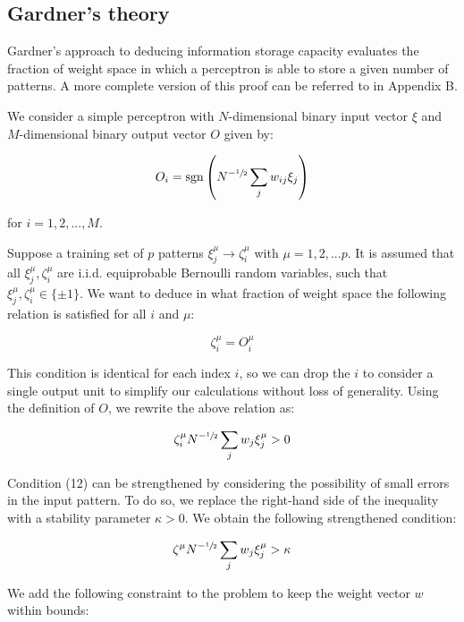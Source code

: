 \documentclass[a4paper, 11pt]{article}
\begin{document}
\subsection{Gardner's theory}

Gardner's approach to deducing information storage capacity evaluates the fraction of weight space in which a perceptron is able to store a given number of patterns. A more complete version of this proof can be referred to in Appendix B.

We consider a simple perceptron with $N$-dimensional binary input vector $\xi$ and $M$-dimensional binary output vector $O$ given by:

\begin{equation}
    O_i = \mathrm{sgn} \left( N^{-\sfrac{1}{2}} \sum_j w_{ij} \xi_j \right)
\end{equation}

\noindent for $i = 1, 2, ..., M$.

Suppose a training set of $p$ patterns $\xi_j^\mu \longrightarrow \zeta_i^\mu$ with $\mu = 1, 2, ... p$. It is assumed that all $\xi_j^\mu, \zeta_i^\mu$ are i.i.d. equiprobable Bernoulli random variables, such that $\xi_j^\mu, \zeta_i^\mu \in \{ \pm 1 \}$. We want to deduce in what fraction of weight space the following relation is satisfied for all $i$ and $\mu$:

\begin{equation}
    \zeta_i^\mu = O_i^\mu
\end{equation}

This condition is identical for each index $i$, so we can drop the $i$ to consider a single output unit to simplify our calculations without loss of generality. Using the definition of $O$, we rewrite the above relation as:

\begin{equation}
    \zeta_i^\mu N^{-\sfrac{1}{2}}\sum_j w_{j} \xi_j^\mu > 0
\end{equation}

Condition (12) can be strengthened by considering the possibility of small errors in the input pattern. To do so, we replace the right-hand side of the inequality with a stability parameter $\kappa > 0$. We obtain the following strengthened condition:

\begin{equation}
    \zeta^\mu N^{-\sfrac{1}{2}}\sum_j w_{j} \xi_j^\mu > \kappa
\end{equation}

We add the following constraint to the problem to keep the weight vector $w$ within bounds:
\end{document}
